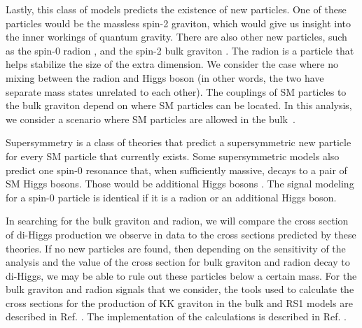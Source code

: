 Lastly, this class of models predicts the existence of new particles. One of these particles would be the massless spin-2 graviton, which would give us insight into the inner workings of quantum gravity. There are also other new particles, such as the spin-0 radion \cite{Goldberger:1999uk,DeWolfe:1999cp,Csaki:1999mp}, and the spin-2 bulk graviton \cite{Davoudiasl:1999jd,Csaki:2000zn, Agashe:2007zd}. The radion is a particle that helps stabilize the size of the extra dimension. We consider the case where no mixing between the radion and Higgs boson (in other words, the two have separate mass states unrelated to each other). The couplings of SM particles to the bulk graviton depend on where SM particles can be located. In this analysis, we consider a scenario where SM particles are allowed in the bulk~\cite{Fitzpatrick:2007qr}.

Supersymmetry is a class of theories that predict a supersymmetric new particle for every SM particle that currently exists. Some supersymmetric models also predict one spin-0 resonance that, when sufficiently massive, decays to a pair of SM Higgs bosons. Those would be additional Higgs bosons \cite{Djouadi:2005gj,Barbieri:2013nka}. The signal modeling for a spin-0 particle is identical if it is a radion or an additional Higgs boson.

In searching for the bulk graviton and radion, we will compare the cross section of di-Higgs production we observe in data to the cross sections predicted by these theories. If no new particles are found, then depending on the sensitivity of the analysis and the value of the cross section for bulk graviton and radion decay to di-Higgs, we may be able to rule out these particles below a certain mass. For the bulk graviton and radion signals that we consider, the tools used to calculate the cross sections for the production of KK graviton in the bulk and RS1 models are described in Ref. \cite{Agashe:2013kyb, deAquino:2011ix}. The implementation of the calculations is described in Ref. \cite{Oliveira:2014kla}.   

